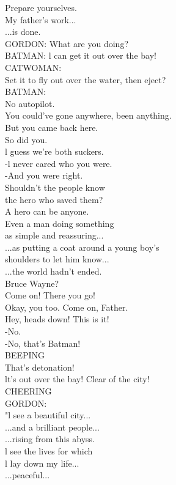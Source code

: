 \documentclass{article}
\begin{document}
\begin{multicols}{3}
Prepare yourselves.\\
My father's work...\\
...is done.\\
GORDON: What are you doing?\\
BATMAN: l can get it out over the bay!\\
CATWOMAN:\\
Set it to fly out over the water, then eject?\\
BATMAN:\\
No autopilot.\\
You could've gone anywhere, been anything.\\
But you came back here.\\
So did you.\\
l guess we're both suckers.\\
-l never cared who you were.\\
-And you were right.\\
Shouldn't the people know\\
the hero who saved them?\\
A hero can be anyone.\\
Even a man doing something\\
as simple and reassuring...\\
...as putting a coat around a young boy's\\
shoulders to let him know...\\
...the world hadn't ended.\\
Bruce Wayne?\\
Come on! There you go!\\
Okay, you too. Come on, Father.\\
Hey, heads down! This is it!\\
-No.\\
-No, that's Batman!\\
BEEPING\\
That's detonation!\\
lt's out over the bay! Clear of the city!\\
CHEERING\\
GORDON:\\
"l see a beautiful city...\\
...and a brilliant people...\\
...rising from this abyss.\\
l see the lives for which\\
l lay down my life...\\
...peaceful...\\

\end{multicols}
\end{document}
